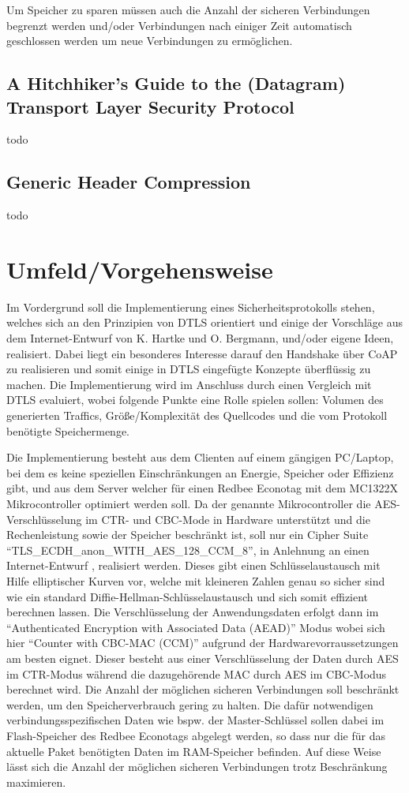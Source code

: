 \documentclass[a4paper,10pt]{report}
\begin{document}
Um Speicher zu sparen müssen auch die Anzahl der sicheren Verbindungen begrenzt werden und/oder Verbindungen nach einiger Zeit
automatisch geschlossen werden um neue Verbindungen zu ermöglichen.

\subsection{A Hitchhiker's Guide to the (Datagram) Transport Layer Security Protocol}
todo \cite{draftmintls}

\subsection{Generic Header Compression}
todo

\section{Umfeld/Vorgehensweise}
Im Vordergrund soll die Implementierung eines Sicherheitsprotokolls stehen, welches sich an den Prinzipien von DTLS orientiert
und einige der Vorschläge aus dem Internet-Entwurf von K. Hartke und O. Bergmann, und/oder eigene Ideen, realisiert.
Dabei liegt ein besonderes Interesse darauf den Handshake über CoAP zu realisieren und somit einige in DTLS eingefügte Konzepte überflüssig zu machen.
Die Implementierung wird im Anschluss durch einen Vergleich mit DTLS evaluiert, wobei folgende Punkte eine Rolle spielen sollen:
Volumen des generierten Traffics, Größe/Komplexität des Quellcodes und die vom Protokoll benötigte Speichermenge.

Die Implementierung besteht aus dem Clienten auf einem gängigen PC/Laptop, bei dem es keine speziellen Einschränkungen an Energie,
Speicher oder Effizienz gibt, und aus dem Server welcher für einen Redbee Econotag \cite{econotag} mit dem MC1322X
Mikrocontroller \cite{mc1322x} optimiert werden soll. Da der genannte Mikrocontroller die AES-Verschlüsselung im CTR- und CBC-Mode
in Hardware unterstützt und die Rechenleistung sowie der Speicher beschränkt ist, soll nur ein Cipher Suite "`TLS\_ECDH\_anon\_WITH\_AES\_128\_CCM_8"',
in Anlehnung an einen Internet-Entwurf \cite{draftaesecc}, realisiert werden. Dieses gibt einen Schlüsselaustausch mit Hilfe elliptischer
Kurven vor, welche mit kleineren Zahlen genau so sicher sind wie ein standard Diffie-Hellman-Schlüsselaustausch und sich somit effizient berechnen
lassen. Die Verschlüsselung der Anwendungsdaten erfolgt dann im "`Authenticated Encryption with Associated Data (AEAD)"' Modus \cite{rfc5116}
wobei sich hier "`Counter with CBC-MAC (CCM)"' \cite{rfc3610} aufgrund der Hardwarevorraussetzungen am besten eignet. Dieser besteht
aus einer Verschlüsselung der Daten durch AES im CTR-Modus während die dazugehörende MAC durch AES im CBC-Modus berechnet wird.
Die Anzahl der möglichen sicheren Verbindungen soll beschränkt werden, um den Speicherverbrauch gering zu halten.
Die dafür notwendigen verbindungsspezifischen Daten wie bspw. der Master-Schlüssel sollen dabei im Flash-Speicher des Redbee Econotags
abgelegt werden, so dass nur die für das aktuelle Paket benötigten Daten im RAM-Speicher befinden. Auf diese Weise lässt sich
die Anzahl der möglichen sicheren Verbindungen trotz Beschränkung maximieren.
\end{document}
